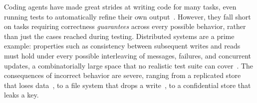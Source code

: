 Coding agents have made great strides at writing code for many tasks, even running tests to automatically refine their own output~\cite{cursor, claude-code, codex, swe-agent, reflexion}. However, they fall short on tasks requiring correctness \textit{guarantees} across every possible behavior, rather than just the cases reached during testing.
Distributed systems are a prime example: properties such as consistency between subsequent writes and reads must hold under every possible interleaving of messages, failures, and concurrent updates, a combinatorially large space that no realistic test suite can cover~\cite{taxdc}. The consequences of incorrect behavior are severe, ranging from a replicated store that loses data~\cite{network_reliable}, to a file system that drops a write~\cite{all_not_equal}, to a confidential store that leaks a key.






